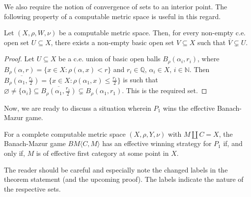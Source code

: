 \documentclass[a4paper,UKenglish,autoref,thm-restate,numberwithinsect]{lipics-v2021}
\begin{document}
We also require the notion of convergence of sets to an interior point. The following property of a computable metric space is useful in this regard.
\begin{lemma}\label{lem:propersubset}
	Let $(X,\rho,W,\nu)$ be a computable metric space. Then, for every non-empty c.e. open set $U\subseteq X$, there exists a non-empty basic open set $V\subseteq X$ such that $\overline{V}\subsetneq U$. 
\end{lemma}
\begin{proof}
	Let $U\subseteq X$ be a c.e. union of basic open balls $B_\rho(\alpha_i,r_i)$, where $B_\rho(\alpha,r)=\{x\in X:\rho(\alpha,x)<r\}$ and $r_i\in\mathbb{Q}$, $\alpha_i\in X$, $i\in\mathbb{N}$. Then $\overline{B_\rho(\alpha_1,\frac{r_1}{2})}=\{x\in X:\rho(\alpha_1,x)\leq\frac{r_1}{2}\}$ is such that $\varnothing\ne\{\alpha_i\} \subseteq \overline{B_\rho(\alpha_1,\frac{r_1}{2})}\subsetneq        B_\rho(\alpha_1,r_1)$. This is the required set. 
\end{proof}
Now, we are ready to discuss a situation wherein $P_1$ wins the effective Banach-Mazur game. 
\begin{theorem}\label{thm:effbm2}
	For a complete computable metric space $(X,\rho,Y,\nu)$ with $M\coprod C=X$, the Banach-Mazur game $BM\langle C,M\rangle$ has an effective winning strategy for $P_1$ if, and only if, $M$ is of effective first category at some point in $X$.
\end{theorem}
The reader should be careful and especially note the changed labels in the theorem statement (and the upcoming proof). The labels indicate the nature of the respective sets. 
\end{document}
